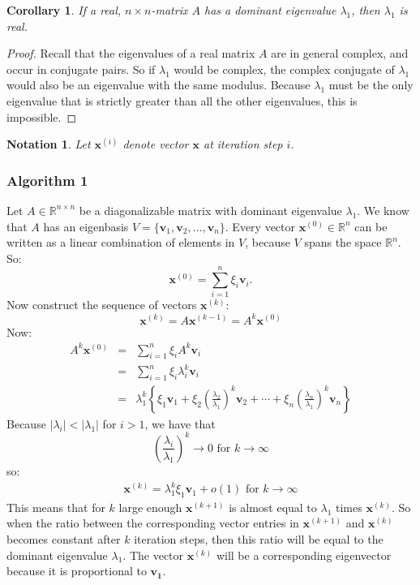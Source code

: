 \documentclass[a4paper,11pt]{report}
\newtheorem{corollary}[theorem]{Corollary}
\newtheorem{notation}[theorem]{Notation}
\newcommand{\R}{{\mathbb R}}
\begin{document}
\begin{corollary}\label{reallambda1}
  If a real, $n\times n$-matrix $A$ has a dominant eigenvalue $\lambda_1$, then $\lambda_1$ is real.
\end{corollary}
\begin{proof}
  Recall that the eigenvalues of a real matrix $A$ are in general complex, and occur in conjugate pairs. So if $\lambda_1$ would be
   complex, the complex conjugate of $\lambda_1$ 
  would also be an eigenvalue with the same modulus. Because $\lambda_1$ must be 
  the only eigenvalue that is strictly greater than all the other eigenvalues, 
  this is impossible.
  \end{proof}



\begin{notation}\label{numeriekenotatie}
  Let $\mathbf{x}^{(i)}$ denote vector $\mathbf{x}$ at iteration step $i$.
\end{notation}
\subsubsection{Algorithm 1}
Let $A \in \R^{n\times n}$ be a diagonalizable matrix with dominant eigenvalue $\lambda_1$.
We know that $A$ has an eigenbasis $V=\{\mathbf{v}_1, \mathbf{v}_2,\ldots,\mathbf{v}_n\}$. Every vector
$\mathbf{x}^{(0)} \in \R^n$ can be written as a linear combination of elements in 
$V$, because $V$ spans the space $\R^n$. So:
$$\mathbf{x}^{(0)} = \sum_{i=1}^n \xi_i \mathbf{v}_i.$$
Now construct the sequence of vectors $\mathbf{x}^{(k)}$:
$$\mathbf{x}^{(k)} = A\mathbf{x}^{(k-1)} = A^k\mathbf{x}^{(0)}$$
Now:
\begin{eqnarray*}
  A^k\mathbf{x}^{(0)} &=& \sum^n_{i=1}\xi_i A^k \mathbf{v}_i\\
  &=& \sum^n_{i=1}\xi_i \lambda_i^k \mathbf{v}_i\\
  &=& \lambda_1^k \left\{\xi_1 \mathbf{v}_1 + \xi_2\left(\frac{\lambda_2}{\lambda_1}\right)^k \mathbf{v}_2 + \cdots +
  \xi_n\left(\frac{\lambda_n}{\lambda_1}\right)^k \mathbf{v}_n \right\}
\end{eqnarray*}
Because $|\lambda_i| < |\lambda_1|$ for $i > 1 $, we have that 
$$\left(\frac{\lambda_i}{\lambda_1}\right)^k \to 0 \text{ for } k \to \infty$$
so:
\begin{eqnarray}\label{tijdscomplexiteit}
  \mathbf{x}^{(k)} = \lambda_1^k \xi_1\mathbf{v}_1 + o(1) \text{ for } k \to \infty
\end{eqnarray}
This means that for $k$ large enough $\mathbf{x}^{(k+1)}$ is almost equal to $\lambda_1$ times $\mathbf{x}^{(k)}$. So when 
the ratio 
between the corresponding
vector entries in $\mathbf{x}^{(k+1)}$ and $\mathbf{x}^{(k)}$ becomes constant 
after $k$ iteration steps, then this ratio will be equal to the dominant eigenvalue 
$\lambda_1$. The vector $\mathbf{x}^{(k)}$ will be a corresponding eigenvector because it is 
proportional to $\mathbf{v_1}$. 
\end{document}
